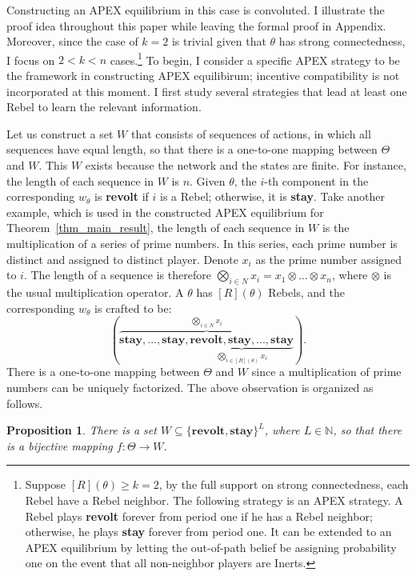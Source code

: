 \documentclass[12pt,letter]{article}
\newtheorem{proposition}{Proposition}[section]
\theoremstyle{definition}
\theoremstyle{remark}
\theoremstyle{claim}
\begin{document}
Constructing an APEX equilibrium in this case is convoluted. I illustrate the proof idea throughout this paper while leaving the formal proof in Appendix. Moreover, since the case of $k=2$ is trivial given that $\theta$ has strong connectedness, I focus on $2<k<n$ cases.\footnote{Suppose $[R](\theta)\geq k=2$, by the full support on strong connectedness, each Rebel have a Rebel neighbor. The following strategy is an APEX strategy. A Rebel plays \textbf{revolt} forever from period one if he has a Rebel neighbor; otherwise, he plays \textbf{stay} forever from period one. It can be extended to an APEX equilibrium by letting the out-of-path belief be assigning probability one on the event that all non-neighbor players are Inerts.} To begin, I consider a specific APEX strategy to be the framework in constructing APEX equilibirum; incentive compatibility is not incorporated at this moment. I first study several strategies that lead at least one Rebel to learn the relevant information. 

Let us construct a set $W$ that consists of sequences of actions, in which all sequences have equal length, so that there is a one-to-one mapping between $\Theta$ and $W$. This $W$ exists because the network and the states are finite. For instance, the length of each sequence in $W$ is $n$. Given $\theta$, the $i$-th component in the corresponding $w_{\theta}$ is \textbf{revolt} if $i$ is a Rebel; otherwise, it is \textbf{stay}. Take another example, which is used in the constructed APEX equilibrium for Theorem~\ref{thm_main_result}, the length of each sequence in $W$ is the multiplication of a series of prime numbers. In this series, each prime number is distinct and assigned to distinct player. Denote $x_i$ as the prime number assigned to $i$. The length of a sequence is therefore $\bigotimes_{i\in N}x_i=x_1\otimes...\otimes x_n$, where $\otimes$ is the usual multiplication operator. A $\theta$ has $[R](\theta)$ Rebels, and the corresponding $w_{\theta}$ is crafted to be:  
\[(\overbrace{\textbf{stay},...,\textbf{stay},\underbrace{\textbf{revolt},\textbf{stay},...,\textbf{stay}}_{\bigotimes_{i\in [R](\theta)}x_i}}^{\bigotimes_{i\in N} x_i}).\]
There is a one-to-one mapping between $\Theta$ and ${W}$ since a multiplication of prime numbers can be uniquely factorized. The above observation is organized as follows.

\begin{proposition}
There is a set $W\subseteq \{\textbf{revolt},\textbf{stay}\}^L$, where $L\in \mathbb{N}$, so that there is a bijective mapping $f: \Theta \rightarrow W$.
\end{proposition}
\end{document}
